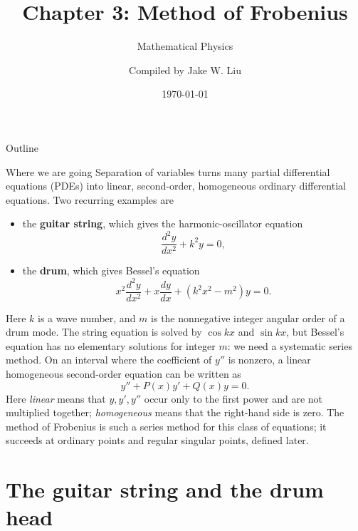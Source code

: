 \documentclass[11pt]{beamer}
\author[]{Compiled by Jake W. Liu}
\title[Method of Frobenius]{Chapter 3: Method of Frobenius}
\subtitle{Mathematical Physics}
\date{\today}
\begin{document}
\setcounter{sfchapter}{3}
\renewcommand{\thesection}{\arabic{sfchapter}.\arabic{section}}

\begin{frame}[c]\titlepage
\end{frame}

\begin{frame}{Outline}
\tableofcontents
\end{frame}

\begin{frame}{Where we are going}
\footnotesize
Separation of variables turns many partial differential equations (PDEs) into linear,
second-order, homogeneous ordinary differential equations. Two recurring examples are
\begin{itemize}
  \item the \textbf{guitar string}, which gives the harmonic-oscillator equation
        \[
          \frac{d^2 y}{dx^2}+k^2y=0,
        \]
  \item the \textbf{drum}, which gives Bessel's equation
        \[
          x^2\frac{d^2y}{dx^2}+x\frac{dy}{dx}+(k^2x^2-m^2)y=0.
        \]
\end{itemize}
Here $k$ is a wave number, and $m$ is the nonnegative integer angular order of a drum
mode.
The string equation is solved by $\cos kx$ and $\sin kx$, but Bessel's equation has
no elementary solutions for integer $m$: we need a systematic series method.
On an interval where the coefficient of $y''$ is nonzero, a linear homogeneous
second-order equation can be written as
\[
  y''+P(x)y'+Q(x)y=0.
\]
Here \emph{linear} means that $y,y',y''$ occur only to the first power and are not
multiplied together; \emph{homogeneous} means that the right-hand side is zero.  The
method of Frobenius is such a series method for this class of equations; it succeeds
at ordinary points and regular singular points, defined later.
\end{frame}

\section{The guitar string and the drum head}
\end{document}
